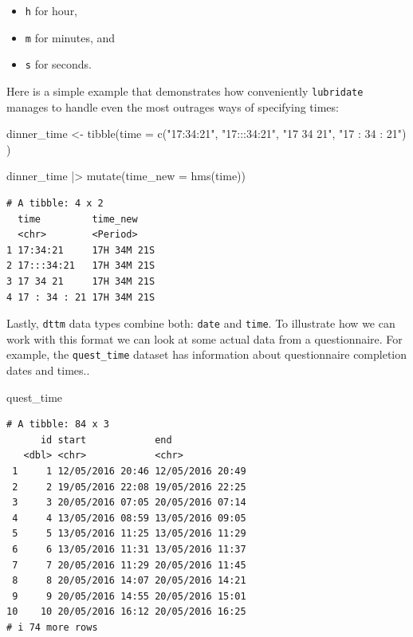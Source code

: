 \documentclass[
  letterpaper,
]{krantz}
\makeatletter
\newenvironment{Shaded}{\begin{snugshade}}{\end{snugshade}}
\newcommand{\AttributeTok}[1]{\textcolor[rgb]{0.40,0.45,0.13}{#1}}
\newcommand{\FunctionTok}[1]{\textcolor[rgb]{0.28,0.35,0.67}{#1}}
\newcommand{\NormalTok}[1]{\textcolor[rgb]{0.00,0.23,0.31}{#1}}
\newcommand{\OtherTok}[1]{\textcolor[rgb]{0.00,0.23,0.31}{#1}}
\newcommand{\SpecialCharTok}[1]{\textcolor[rgb]{0.37,0.37,0.37}{#1}}
\newcommand{\StringTok}[1]{\textcolor[rgb]{0.13,0.47,0.30}{#1}}
\newenvironment{kframe}{%
\medskip{}
\setlength{\fboxsep}{.8em}
 \def\at@end@of@kframe{}%
 \ifinner\ifhmode%
  \def\at@end@of@kframe{\end{minipage}}%
  \begin{minipage}{\columnwidth}%
 \fi\fi%
 \def\FrameCommand##1{\hskip\@totalleftmargin \hskip-\fboxsep
 \colorbox{shadecolor}{##1}\hskip-\fboxsep
     \hskip-\linewidth \hskip-\@totalleftmargin \hskip\columnwidth}%
 \MakeFramed {\advance\hsize-\width
   \@totalleftmargin\z@ \linewidth\hsize
   \@setminipage}}%
 {\par\unskip\endMakeFramed%
 \at@end@of@kframe}
\renewenvironment{Shaded}{\begin{kframe}}{\end{kframe}}
\makeatother
\begin{document}
\begin{itemize}
\item
  \texttt{h} for hour,
\item
  \texttt{m} for minutes, and
\item
  \texttt{s} for seconds.
\end{itemize}

Here is a simple example that demonstrates how conveniently
\texttt{lubridate} manages to handle even the most outrages ways of
specifying times:

\begin{Shaded}
\begin{Highlighting}[]
\NormalTok{dinner\_time }\OtherTok{\textless{}{-}} \FunctionTok{tibble}\NormalTok{(}\AttributeTok{time =} \FunctionTok{c}\NormalTok{(}\StringTok{"17:34:21"}\NormalTok{,}
                               \StringTok{"17:::34:21"}\NormalTok{,}
                               \StringTok{"17 34 21"}\NormalTok{,}
                               \StringTok{"17 : 34 : 21"}\NormalTok{)}
\NormalTok{                      )}

\NormalTok{dinner\_time }\SpecialCharTok{|\textgreater{}} \FunctionTok{mutate}\NormalTok{(}\AttributeTok{time\_new =} \FunctionTok{hms}\NormalTok{(time))}
\end{Highlighting}
\end{Shaded}

\begin{verbatim}
# A tibble: 4 x 2
  time         time_new   
  <chr>        <Period>   
1 17:34:21     17H 34M 21S
2 17:::34:21   17H 34M 21S
3 17 34 21     17H 34M 21S
4 17 : 34 : 21 17H 34M 21S
\end{verbatim}

Lastly, \texttt{dttm} data types combine both: \texttt{date} and
\texttt{time}. To illustrate how we can work with this format we can
look at some actual data from a questionnaire. For example, the
\texttt{\textasciigrave{}quest\_time\textasciigrave{}} dataset has
information about questionnaire completion dates and times..

\begin{Shaded}
\begin{Highlighting}[]
\NormalTok{quest\_time}
\end{Highlighting}
\end{Shaded}

\begin{verbatim}
# A tibble: 84 x 3
      id start            end             
   <dbl> <chr>            <chr>           
 1     1 12/05/2016 20:46 12/05/2016 20:49
 2     2 19/05/2016 22:08 19/05/2016 22:25
 3     3 20/05/2016 07:05 20/05/2016 07:14
 4     4 13/05/2016 08:59 13/05/2016 09:05
 5     5 13/05/2016 11:25 13/05/2016 11:29
 6     6 13/05/2016 11:31 13/05/2016 11:37
 7     7 20/05/2016 11:29 20/05/2016 11:45
 8     8 20/05/2016 14:07 20/05/2016 14:21
 9     9 20/05/2016 14:55 20/05/2016 15:01
10    10 20/05/2016 16:12 20/05/2016 16:25
# i 74 more rows
\end{verbatim}
\end{document}
